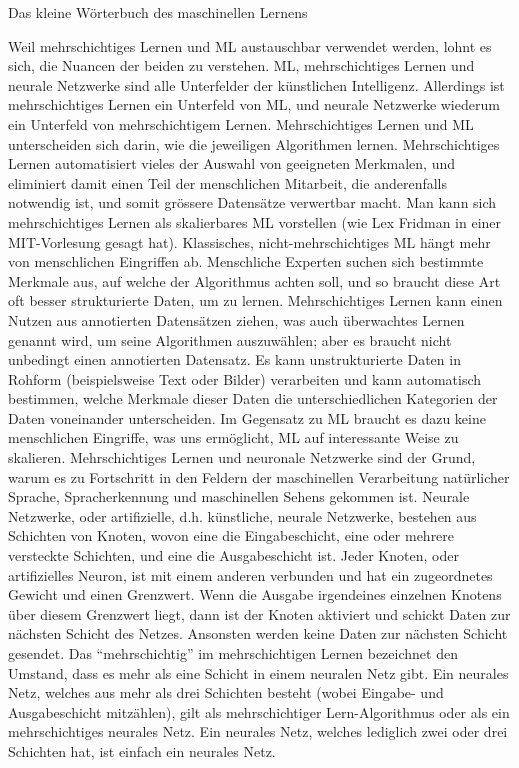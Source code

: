 \begin{lpu}{Das kleine Wörterbuch des maschinellen Lernens}
\begin{artikelbox}
Weil mehrschichtiges Lernen und ML austauschbar verwendet werden, lohnt es sich, die Nuancen der beiden zu verstehen. ML, mehrschichtiges Lernen und neurale Netzwerke sind alle Unterfelder der künstlichen Intelligenz. Allerdings ist mehrschichtiges Lernen ein Unterfeld von ML, und neurale Netzwerke wiederum ein Unterfeld von mehrschichtigem Lernen.
Mehrschichtiges Lernen und ML unterscheiden sich darin, wie die jeweiligen Algorithmen lernen. Mehrschichtiges Lernen automatisiert vieles der Auswahl von geeigneten Merkmalen, und eliminiert damit einen Teil der menschlichen Mitarbeit, die anderenfalls notwendig ist, und somit grössere Datensätze verwertbar macht. Man kann sich mehrschichtiges Lernen als skalierbares ML vorstellen (wie Lex Fridman in einer MIT-Vorlesung gesagt hat). Klassisches, nicht-mehrschichtiges ML hängt mehr von menschlichen Eingriffen ab. Menschliche Experten suchen sich bestimmte Merkmale aus, auf welche der Algorithmus achten soll, und so braucht diese Art oft besser strukturierte Daten, um zu lernen.
Mehrschichtiges Lernen kann einen Nutzen aus annotierten Datensätzen ziehen, was auch überwachtes Lernen genannt wird, um seine Algorithmen auszuwählen; aber es braucht nicht unbedingt einen annotierten Datensatz. Es kann unstrukturierte Daten in Rohform (beispielsweise Text oder Bilder) verarbeiten und kann automatisch bestimmen, welche Merkmale dieser Daten die unterschiedlichen Kategorien der Daten voneinander unterscheiden. Im Gegensatz zu ML braucht es dazu keine menschlichen Eingriffe, was uns ermöglicht, ML auf interessante Weise zu skalieren. Mehrschichtiges Lernen und neuronale Netzwerke sind der Grund, warum es zu Fortschritt in den Feldern der maschinellen Verarbeitung natürlicher Sprache, Spracherkennung und maschinellen Sehens gekommen ist.
Neurale Netzwerke, oder artifizielle, d.h. künstliche, neurale Netzwerke, bestehen aus Schichten von Knoten, wovon eine die Eingabeschicht, eine oder mehrere versteckte Schichten, und eine die Ausgabeschicht ist. Jeder Knoten, oder artifizielles Neuron, ist mit einem anderen verbunden und hat ein zugeordnetes Gewicht und einen Grenzwert. Wenn die Ausgabe irgendeines einzelnen Knotens über diesem Grenzwert liegt, dann ist der Knoten aktiviert und schickt Daten zur nächsten Schicht des Netzes. Ansonsten werden keine Daten zur nächsten Schicht gesendet. Das ``mehrschichtig'' im mehrschichtigen Lernen bezeichnet den Umstand, dass es mehr als eine Schicht in einem neuralen Netz gibt. Ein neurales Netz, welches aus mehr als drei Schichten besteht (wobei Eingabe- und Ausgabeschicht mitzählen), gilt als mehrschichtiger Lern-Algorithmus oder als ein mehrschichtiges neurales Netz. Ein neurales Netz, welches lediglich zwei oder drei Schichten hat, ist einfach ein neurales Netz.


\end{artikelbox}
\end{lpu}
